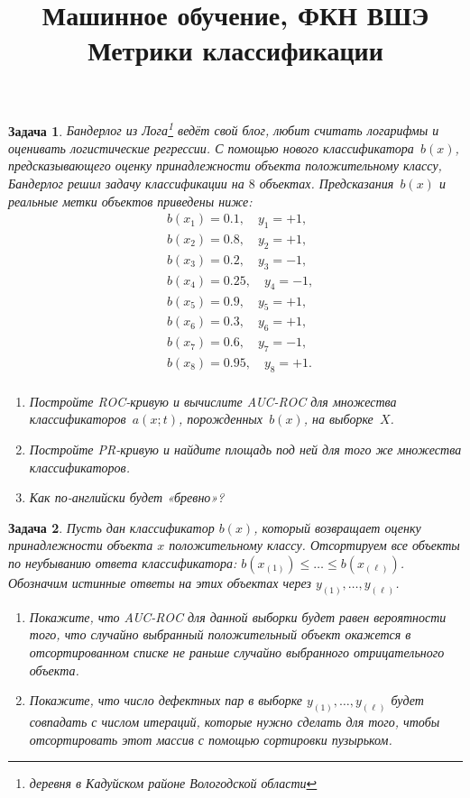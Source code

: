 \documentclass[12pt,fleqn]{article}
\title{Машинное обучение, ФКН ВШЭ\\ Метрики классификации}
\author{}
\date{}
\newtheorem{esProblem}{Задача}
\begin{document}
\maketitle


\begin{esProblem}
    Бандерлог из Лога\footnote{деревня в Кадуйском районе Вологодской области} ведёт свой блог, любит считать логарифмы и оценивать логистические регрессии. С помощью нового классификатора~$b(x)$, предсказывающего оценку принадлежности объекта положительному классу, Бандерлог решил задачу классификации на $8$ объектах. Предсказания~$b(x)$ и реальные метки объектов приведены ниже:
	\begin{align*}
		&b(x_1) = 0.1, \quad  y_1 = +1,\\
		&b(x_2) = 0.8, \quad y_2 = +1,\\
		&b(x_3) = 0.2, \quad y_3 = -1,\\
		&b(x_4) = 0.25, \quad y_4 = -1,\\
		&b(x_5) = 0.9, \quad y_5 = +1,\\
		&b(x_6) = 0.3, \quad y_6 = +1,\\
		&b(x_7) = 0.6, \quad y_7 = -1,\\
		&b(x_8) = 0.95, \quad y_8 = +1.\\
	\end{align*}
	
    \begin{enumerate} 
        \item Постройте ROC-кривую и вычислите AUC-ROC для множества классификаторов~$a(x;t)$, порожденных~$b(x)$, на выборке~$X$.
        \item Постройте PR-кривую и найдите площадь под ней для того же множества классификаторов. 
        \item Как по-английски будет «бревно»?
    \end{enumerate} 
\end{esProblem}

\begin{esProblem}
	Пусть дан  классификатор $b(x)$, который возвращает оценку принадлежности объекта $x$ положительному классу. Отсортируем все объекты по неубыванию ответа классификатора: $b(x_{(1)}) \le \dots \le b(x_{(\ell)})$. Обозначим истинные ответы на этих объектах через $y_{(1)}, \dots, y_{(\ell)}$.
	
	\begin{enumerate} 
	\item Покажите, что AUC-ROC для данной выборки будет равен вероятности того, что случайно выбранный положительный объект окажется в отсортированном списке не раньше случайно выбранного отрицательного объекта.
	
	\item Покажите, что число дефектных пар в выборке $y_{(1)}, \dots, y_{(\ell)}$ будет совпадать с числом итераций, которые нужно сделать для того, чтобы отсортировать этот массив с помощью сортировки пузырьком. 
	\end{enumerate} 
\end{esProblem}
\end{document}
